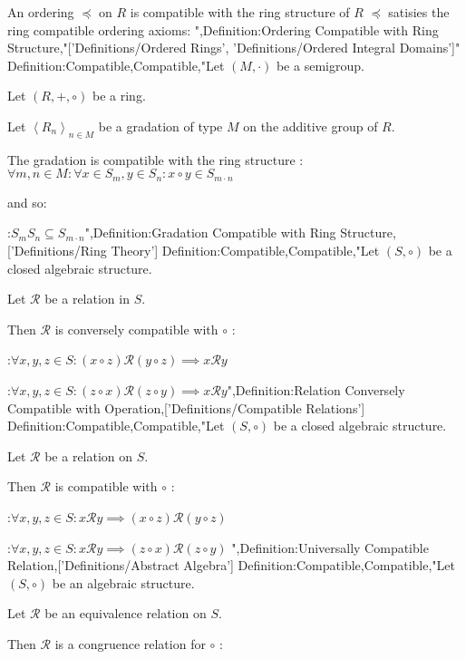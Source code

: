 An ordering $\preccurlyeq$ on $R$ is compatible with the ring structure of $R$  $\preccurlyeq$ satisies the ring compatible ordering axioms:
",Definition:Ordering Compatible with Ring Structure,"['Definitions/Ordered Rings', 'Definitions/Ordered Integral Domains']"
Definition:Compatible,Compatible,"Let $\left( M, \cdot \right)$ be a semigroup.

Let $\left( R, +, \circ \right)$ be a ring.

Let $\left\langle R_n \right\rangle_{n \mathop \in M}$ be a gradation of type $M$ on the additive group of $R$.


The gradation is compatible with the ring structure 
:$\forall m, n \in M : \forall x \in S_m, y \in S_n: x \circ y \in S_{m \cdot n}$

and so:

:$S_m S_n \subseteq S_ {m \cdot n}$",Definition:Gradation Compatible with Ring Structure,['Definitions/Ring Theory']
Definition:Compatible,Compatible,"Let $\left( S, \circ \right)$ be a closed algebraic structure.

Let $\mathcal R$ be a relation in $S$.


Then $\mathcal R$ is conversely compatible with $\circ$ :

:$\forall x, y, z \in S: \left( x \circ z \right) \mathrel \mathcal R \left( y \circ z \right) \implies x \mathrel \mathcal R y$

:$\forall x, y, z \in S: \left( z \circ x \right) \mathrel \mathcal R \left( z \circ y \right) \implies x \mathrel \mathcal R y$",Definition:Relation Conversely Compatible with Operation,['Definitions/Compatible Relations']
Definition:Compatible,Compatible,"Let $\left( S, \circ \right)$ be a closed algebraic structure.

Let $\mathcal R$ be a relation on $S$.


Then $\mathcal R$ is compatible with $\circ$ :

:$\forall x, y, z \in S: x \mathrel \mathcal R y \implies \left( x \circ z \right) \mathrel \mathcal R \left( y \circ z \right)$

:$\forall x, y, z \in S: x \mathrel \mathcal R y \implies \left( z \circ x \right) \mathrel \mathcal R \left( z \circ y \right)$
",Definition:Universally Compatible Relation,['Definitions/Abstract Algebra']
Definition:Compatible,Compatible,"Let $\left( S, \circ \right)$ be an algebraic structure.

Let $\mathcal R$ be an equivalence relation on $S$.


Then $\mathcal R$ is a congruence relation for $\circ$ :

